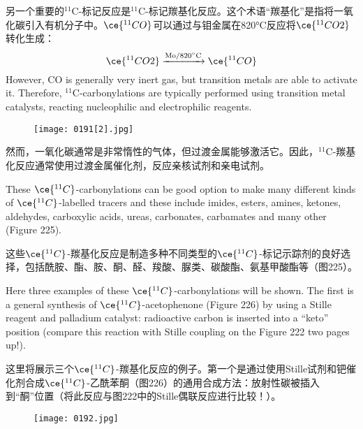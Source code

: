 \documentclass[dvipsnames, svgnames,a4paper,11pt]{article}
\begin{document}
另一个重要的${}^\mathrm{11}\mathrm{C}$-标记反应是${}^\mathrm{11}\mathrm{C}$-标记羰基化反应。这个术语“羰基化”是指将一氧化碳引入有机分子中。\(\ce{^{11}CO}\)可以通过与钼金属在820°C反应将\(\ce{^{11}CO2}\)转化生成：  
\[
\ce{^{11}CO2} \xrightarrow {\mathrm{Mo/820^\circ C}} \ce{^{11}CO}
\]
However, CO is generally very inert gas, but transition metals are able to activate it. Therefore, ${}^\mathrm{11}\mathrm{C}$-carbonylations are typically performed using transition metal catalysts, reacting nucleophilic and electrophilic reagents.


\begin{figure}[h]
	\centering
    \texttt{[image: 0191[2].jpg]}  
     \label{fig225}
\end{figure}

然而，一氧化碳通常是非常惰性的气体，但过渡金属能够激活它。因此，${}^\mathrm{11}\mathrm{C}$-羰基化反应通常使用过渡金属催化剂，反应亲核试剂和亲电试剂。

These \(\ce{^{11}C}\)-carbonylations can be good option to make many different kinds of \(\ce{^{11}C}\)-labelled tracers and these include imides, esters, amines, ketones, aldehydes, carboxylic acids, ureas, carbonates, carbamates and many other (Figure 225).


这些\(\ce{^{11}C}\)-羰基化反应是制造多种不同类型的\(\ce{^{11}C}\)-标记示踪剂的良好选择，包括酰胺、酯、胺、酮、醛、羧酸、脲类、碳酸酯、氨基甲酸酯等（图225）。

Here three examples of these \(\ce{^{11}C}\)-carbonylations will be shown. The first is a general synthesis of \(\ce{^{11}C}\)-acetophenone (Figure 226) by using a Stille reagent and palladium catalyst: radioactive carbon is inserted into a “keto” position (compare this reaction with Stille coupling on the Figure 222 two pages up!).

这里将展示三个\(\ce{^{11}C}\)-羰基化反应的例子。第一个是通过使用Stille试剂和钯催化剂合成\(\ce{^{11}C}\)-乙酰苯酮（图226）的通用合成方法：放射性碳被插入到“酮”位置（将此反应与图222中的Stille偶联反应进行比较！）。

\begin{figure}[h]
	\centering
    \texttt{[image: 0192.jpg]}  
     \label{fig226}
\end{figure}
\end{document}
